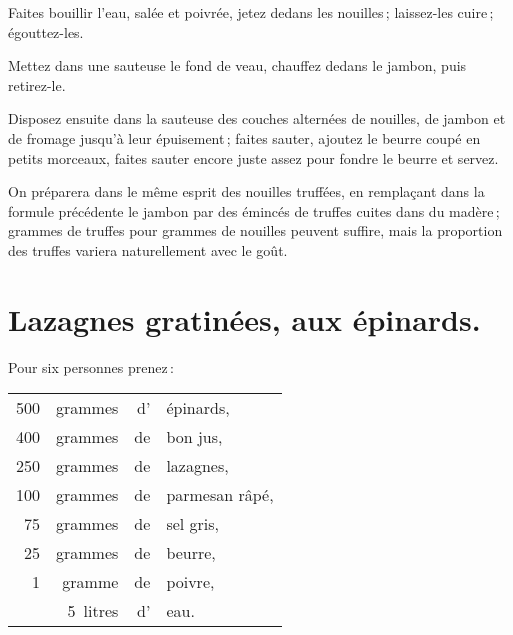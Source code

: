 Faites bouillir l'eau, salée et poivrée, jetez dedans les nouilles ;
laissez-les cuire ; égouttez-les.

Mettez dans une sauteuse le fond de veau, chauffez dedans le jambon, puis
retirez-le.

Disposez ensuite dans la sauteuse des couches alternées de nouilles, de jambon
et de fromage jusqu'à leur épuisement ; faites sauter, ajoutez le beurre coupé en
petits morceaux, faites sauter encore juste assez pour fondre le beurre et servez.

\sk

On préparera dans le même esprit des nouilles truffées, en remplaçant dans la
formule précédente le jambon par des émincés de truffes cuites dans du madère ;
{\mmm} grammes de truffes pour {\mmm} grammes de nouilles peuvent
suffire, mais la proportion des truffes variera naturellement avec le goût.

\section*{\centering Lazagnes gratinées, aux épinards.}
{}

Pour six personnes prenez :

\footnotesize
\begin{longtable}{rrrp{16em}}
    500 & grammes  & d' & épinards,                                                                       \\
    400 & grammes  & de & bon jus,                                                                        \\
    250 & grammes  & de & lazagnes,                                                                       \\
    100 & grammes  & de & parmesan râpé,                                                                  \\
     75 & grammes  & de & sel gris,                                                                       \\
     25 & grammes  & de & beurre,                                                                         \\
      1 & gramme   & de & poivre,                                                                         \\
        & 5 litres & d' & eau.                                                                            \\
\end{longtable}
\normalsize

